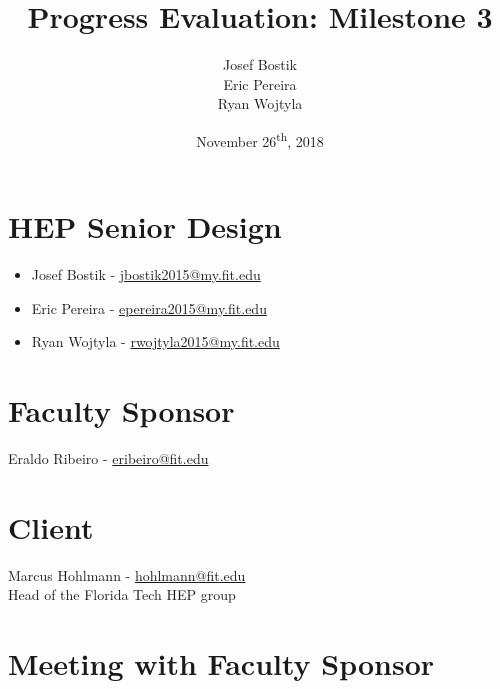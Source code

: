 \documentclass[12pt]{article}
\newcommand\tab[1][1cm]{\hspace*{#1}}
\begin{document}
	

\begin{titlepage}
	
\author{Josef Bostik\\
	Eric Pereira\\
	Ryan Wojtyla\\}
\date{November 26\textsuperscript{th}, 2018}
\title{Progress Evaluation: Milestone 3}

\maketitle

\end{titlepage}

\tableofcontents

\newpage {}

\section{HEP Senior Design}

\begin{itemize}
	\item Josef Bostik - \href{mailto:jbostik2015@my.fit.edu}{jbostik2015@my.fit.edu}
	\item Eric Pereira - \href{mailto:epereira2015@my.fit.edu}{epereira2015@my.fit.edu }
	\item Ryan Wojtyla - \href{mailto:rwojtyla2015@my.fit.edu}{rwojtyla2015@my.fit.edu}
\end{itemize}

\section{Faculty Sponsor}

\tab Eraldo Ribeiro - \href{mailto:eribeiro@fit.edu}{eribeiro@fit.edu}

\section{Client}

\tab Marcus Hohlmann - \href{mailto:hohlmann@fit.edu}{hohlmann@fit.edu} \\ 
\tab Head of the Florida Tech HEP group

\section{Meeting with Faculty Sponsor}
\end{document}
